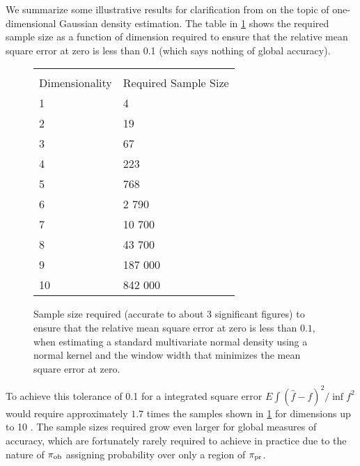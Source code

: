 We summarize some illustrative results for clarification from \cite{Silverman} on the topic of one-dimensional Gaussian density estimation.
The table in \ref{table:silverman} shows the required sample size as a function of dimension required to ensure that the relative mean square error at zero is less than 0.1 (which says nothing of global accuracy).

\begin{figure}
  \begin{tabular}{ l | l }
  \hline \\ Dimensionality & Required Sample Size\\ \hline
  1  & 4\\
  2  & 19\\
  3  & 67\\
  4  & 223\\
  5  & 768\\
  6  & 2 790\\
  7  & 10 700\\
  8  & 43 700\\
  9  & 187 000\\
  10 & 842 000\\ \hline
  \end{tabular}
\caption{Sample size required (accurate to about 3 significant figures) to ensure that the relative mean square error at zero is less than $0.1$, when estimating a standard multivariate normal density using a normal kernel and the window width that minimizes the mean square error at zero.}
\label{table:silverman}
\end{figure}

To achieve this tolerance of 0.1 for a integrated square error $E \int (\hat{f} - f)^2 / \inf f^2$ would require approximately $1.7$ times the samples shown in \ref{table:silverman} for dimensions up to 10 \cite{Silverman}.
The sample sizes required grow even larger for global measures of accuracy, which are fortunately rarely required to achieve in practice due to the nature of $\operatorname*{\pi_{ob}}$ assigning probability over only a region of $\operatorname*{\pi_{pr}}$.
